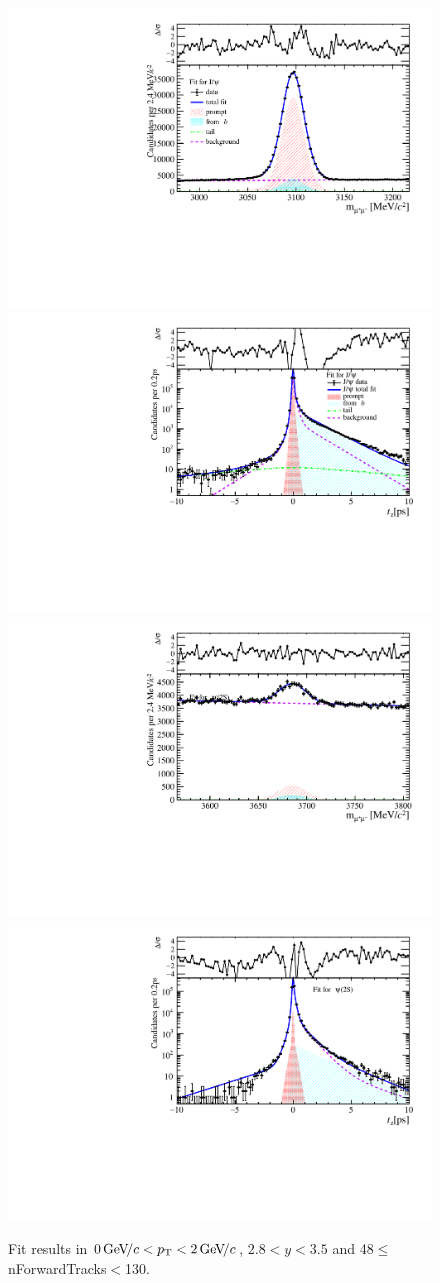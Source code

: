 \begin{figure}[H]
\begin{center}
\includegraphics[width=0.47\linewidth]{pdf/Jpsi/drawmassF/n5y2pt1.pdf}
\includegraphics[width=0.47\linewidth]{pdf/Jpsi/2DFitF/n5y2pt1.pdf}
\vspace*{-0.5cm}
\includegraphics[width=0.47\linewidth]{pdf/Psi2S/drawmassF/n5y2pt1.pdf}
\includegraphics[width=0.47\linewidth]{pdf/Psi2S/2DFitF/n5y2pt1.pdf}
\vspace*{-0.5cm}
\end{center}
\caption{Fit results in $0\text{\,Ge\kern -0.1em V\!/}c<p_{\mathrm{T}}<2\text{\,Ge\kern -0.1em V\!/}c$, $2.8<y<3.5$ and 48$\leq$nForwardTracks$<$130.}
\label{Fitn5y2pt1}
\end{figure}

